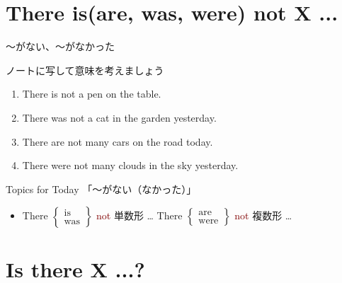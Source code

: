 \documentclass[aspectratio=169,xcolor={dvipsnames,table}]{beamer}
\newcommand{\myaudio}[1]{\href{#1}{\faVolumeUp}}
\begin{document}
\section{There is(are, was, were) not X ...}
\begin{frame}[plain]{〜がない、～がなかった}

ノートに写して意味を考えましょう

\begin{enumerate}
 \item There is not a pen on the table.
 \item There was not a cat in the garden yesterday.
 \item There are not many cars on the road today.
 \item There were not many clouds in the sky yesterday.
\end{enumerate}


\begin{exampleblock}{Topics for Today}
「〜がない（なかった）」
\begin{itemize}
 \item There $\left\{\begin{array}{l}\text{is}\\\text{was}\end{array}
\right\}$ \textcolor{Maroon}{not} 単数形 \ldots\hspace{40pt}
There $\left\{\begin{array}{l}\text{are}\\\text{were}\end{array}
\right\}$ \textcolor{Maroon}{not} 複数形 \ldots
\end{itemize}
\end{exampleblock}

\hfill\myaudio{./audio/001_there_is_05.mp3}
\end{frame}

\section{Is there X ...?}
\end{document}
